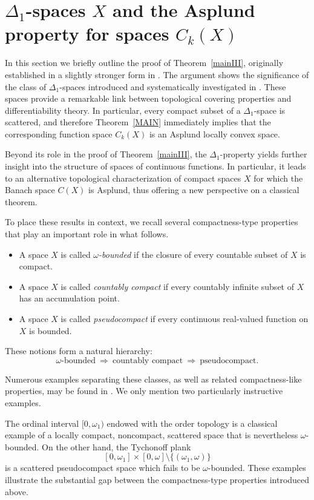 \documentclass[12pt]{amsart}
\theoremstyle{plain}
\theoremstyle{definition}
\theoremstyle{remark}
\begin{document}
\section{$\Delta_1$-spaces $X$ and the Asplund property for spaces  $C_k(X)$}
In this section we briefly outline the proof of Theorem~\ref{mainIII}, originally established in a slightly stronger form in \cite[Theorem~3.2]{KKuL}. The argument shows the significance of the class of $\Delta_1$-spaces introduced and systematically investigated in \cite{KKuL}. These spaces provide a remarkable link between topological covering properties and differentiability theory. In particular, every compact subset of a $\Delta_1$-space is scattered, and therefore Theorem~\ref{MAIN} immediately implies that the corresponding function space $C_k(X)$ is an Asplund locally convex space.

Beyond its role in the proof of Theorem~\ref{mainIII}, the $\Delta_1$-property yields further insight into the structure of spaces of continuous functions. In particular, it leads to an alternative topological characterization of compact spaces $X$ for which the Banach space $C(X)$ is Asplund, thus offering  a new perspective on a classical theorem.

To place these results in context, we recall several compactness-type properties that play an important role in what follows.

\begin{itemize}
\item A space $X$ is called {\it $\omega$-bounded} if the closure of every countable subset of $X$ is compact.

\item A space $X$ is called {\it countably compact} if every countably infinite subset of $X$ has an accumulation point.

\item A space $X$ is called {\it pseudocompact} if every continuous real-valued function on $X$ is bounded.
\end{itemize}

These notions form a natural hierarchy:
\[
\omega\text{-bounded}
\ \Longrightarrow\
\text{countably compact}
\ \Longrightarrow\
\text{pseudocompact}.
\]

Numerous examples separating these classes, as well as related compactness-like properties, may be found in \cite{KKuL}. We only mention two particularly instructive examples.

The ordinal interval $[0,\omega_1)$ endowed with the order topology is a classical example of a locally compact, noncompact, scattered space that is nevertheless $\omega$-bounded. On the other hand, the Tychonoff plank
\[
[0,\omega_1]\times[0,\omega]\setminus\{(\omega_1,\omega)\}
\]
is a scattered pseudocompact space which fails to be $\omega$-bounded. These examples illustrate the substantial gap between the compactness-type properties introduced above.
\end{document}
